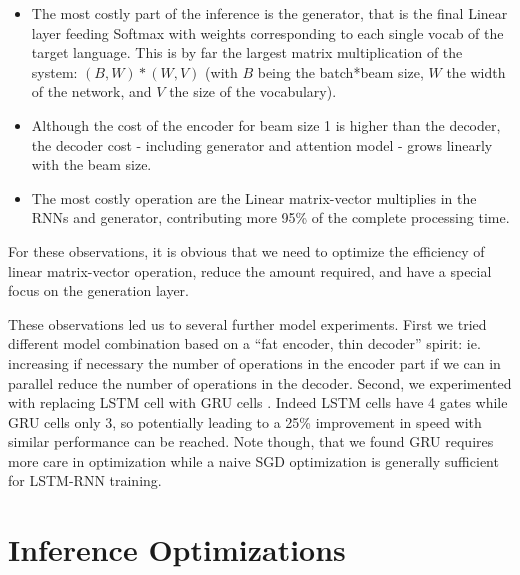 \documentclass[11pt,a4paper]{article}
\begin{document}
\begin{itemize}
\item The most costly part of the inference is the generator, that is the final Linear layer feeding Softmax with weights corresponding to each single vocab of the target language. This is by far the largest matrix multiplication of the system: $(B,W) * (W,V)$ (with $B$ being the batch*beam size, $W$ the width of the network, and $V$ the size of the vocabulary).
\item Although the cost of the encoder for beam size 1 is higher than the decoder, the decoder cost - including generator and attention model - grows linearly with the beam size.
\item The most costly operation are the Linear matrix-vector multiplies in the RNNs and generator,
  contributing more 95\% of the complete processing time.
\end{itemize}

For these observations, it is obvious that we need to optimize the
efficiency of linear matrix-vector operation, reduce the amount
required, and have a special focus on the generation layer.

These observations led us to several further model experiments.  First
we tried different model combination based on a ``fat encoder, thin
decoder'' spirit: ie. increasing if necessary the number of operations
in the encoder part if we can in parallel reduce the number of
operations in the decoder. Second, we experimented with replacing LSTM
cell with GRU cells \cite{DBLP:journals/corr/ChoMGBSB14}. Indeed LSTM
cells have 4 gates while GRU cells only 3, so potentially leading to a
25\% improvement in speed with similar performance can be
reached. Note though, that we found GRU requires more care in optimization
while a naive SGD optimization is generally sufficient for
LSTM-RNN training.


\section{Inference Optimizations}



\end{document}
